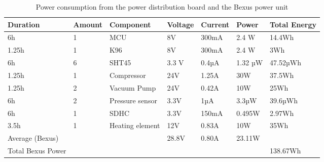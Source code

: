 \documentclass[ %
  a4paper, %
  11pt, %
  openany, %
  parskip, %
  toc=totoc, %
  listof=totoc, %
  bibliography=totoc %
]{scrreprt} %
\providecommand{\DIFaddbeginFL}{} %
\providecommand{\DIFaddendFL}{} %
\providecommand{\DIFdelbeginFL}{} %
\providecommand{\DIFdelendFL}{} %
\providecommand{\DIFscaledelfig}{0.5}
\newlength{\DIFdelgraphicswidth} %
\newlength{\DIFdelgraphicsheight} %
\providecommand{\DIFaddincludegraphics}[2][]{{\color{blue}\fbox{\DIFOincludegraphics[#1]{#2}}}} %
\providecommand{\DIFdelincludegraphics}[2][]{%
\sbox{\DIFdelgraphicsbox}{\DIFOincludegraphics[#1]{#2}}%
\settoboxwidth{\DIFdelgraphicswidth}{\DIFdelgraphicsbox} %
\settoboxtotalheight{\DIFdelgraphicsheight}{\DIFdelgraphicsbox} %
\scalebox{\DIFscaledelfig}{%
\parbox[b]{\DIFdelgraphicswidth}{\usebox{\DIFdelgraphicsbox}\\[-\baselineskip] \rule{\DIFdelgraphicswidth}{0em}}\llap{\resizebox{\DIFdelgraphicswidth}{\DIFdelgraphicsheight}{%
\setlength{\unitlength}{\DIFdelgraphicswidth}%
\begin{picture}(1,1)%
\thicklines\linethickness{2pt} %
{\color[rgb]{1,0,0}\put(0,0){\framebox(1,1){}}}%
{\color[rgb]{1,0,0}\put(0,0){\line( 1,1){1}}}%
{\color[rgb]{1,0,0}\put(0,1){\line(1,-1){1}}}%
\end{picture}%
}\hspace*{3pt}}} %
} %
\DeclareRobustCommand{\DIFaddbeginFL}{\DIFOaddbeginFL \let\includegraphics\DIFaddincludegraphics} %
\DeclareRobustCommand{\DIFaddendFL}{\DIFOaddendFL \let\includegraphics\DIFOincludegraphics} %
\DeclareRobustCommand{\DIFdelbeginFL}{\DIFOdelbeginFL \let\includegraphics\DIFdelincludegraphics} %
\DeclareRobustCommand{\DIFdelendFL}{\DIFOaddendFL \let\includegraphics\DIFOincludegraphics} %
\begin{document}
\begin{table}[H]
\centering
\caption{Power consumption from the power distribution board and the Bexus power unit}
\label{tab:power_consumption}
\DIFdelbeginFL %
\DIFdelendFL \DIFaddbeginFL \begin{tabular}{L{1.6cm}llllll}
\toprule
\textbf{Duration} & \textbf{Amount} & \textbf{Component} & \textbf{Voltage} & \textbf{Current} & \textbf{Power} & \textbf{Total Energy} \\
\midrule
6h & 1 & MCU & 8V & 300mA & 2.4 W & 14.4Wh \\
1.25h & 1 & K96 & 8V & 300mA & 2.4 W & 3Wh \\
6h & 6 & SHT45 & 3.3 V & 0.4µA & 1.32 µW & 47.52µWh \\
1.25h & 1 & Compressor & 24V & 1.25A & 30W & 37.5Wh \\
1.25h & 2 & Vacuum Pump & 24V & 0.42A & 10W & 25Wh \\
6h & 2 & Pressure sensor & 3.3V & 1µA & 3.3µW & 39.6µWh \\
6h & 1 &SDHC &3.3V& 150mA & 0.495W & 2.97Wh \\
3.5h & 1 &Heating element &12V& 0.83A & 10W & 35Wh \\

\midrule
Average (Bexus) & & & 28.8V & 0.80A & 23.11W\\
Total Bexus Power & & & & & & 138.67Wh \\
\bottomrule
\end{tabular}
\DIFaddendFL \end{table}
\end{document}
